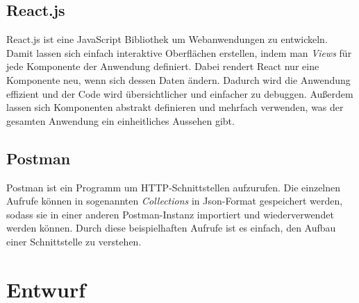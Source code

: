 \documentclass[12pt,twoside,a4paper]{article}
\begin{document}
\subsection{React.js}
React.js ist eine JavaScript Bibliothek um Webanwendungen zu entwickeln. Damit lassen sich einfach interaktive Oberflächen erstellen, indem man \textit{Views} für jede Komponente der Anwendung definiert. Dabei rendert React nur eine Komponente neu, wenn sich dessen Daten ändern. Dadurch wird die Anwendung effizient und der Code wird übersichtlicher und einfacher zu debuggen. Außerdem lassen sich Komponenten abstrakt definieren und mehrfach verwenden, was der gesamten Anwendung ein einheitliches Aussehen gibt. \cite{react}
\subsection{Postman}\label{sec:postman}
Postman ist ein Programm um HTTP-Schnittstellen aufzurufen. Die einzelnen Aufrufe können in sogenannten \textit{Collections} in Json-Format gespeichert werden, sodass sie in einer anderen Postman-Instanz importiert und wiederverwendet werden können. Durch diese beispielhaften Aufrufe ist es einfach, den Aufbau einer Schnittstelle zu verstehen.
\newpage
\section{Entwurf}
\end{document}
